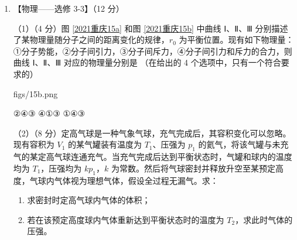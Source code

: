 \documentclass[\gkver]{gaokaozhenti}
\begin{document}
\begin{enumerate}
\item
【物理——选修 3-3】（12 分）

（1）（4 分）图 \ref{2021重庆15a} 和图 \ref{2021重庆15b} 中曲线 Ⅰ、Ⅱ、Ⅲ 分别描述了某物理量随分子之间的距离变化的规律，$r_{0}$ 为平衡位置。现有如下物理量：①分子势能，②分子间引力，③分子间斥力，④分子间引力和斥力的合力，则曲线 Ⅰ、Ⅱ、Ⅲ 对应的物理量分别是 （在给出的 4 个选项中，只有一个符合要求的）

{figs/15b.png}

{②④③}
{④①③}
{①④③}

（2）（8 分）定高气球是一种气象气球，充气完成后，其容积变化可以忽略。现有容积为 $V_{1}$ 的某气罐装有温度为 $T_{1}$、压强为 $p_{1}$ 的氦气，将该气罐与未充气的某定高气球连通充气。当充气完成后达到平衡状态时，气罐和球内的温度均为 $T_{1}$，压强均为 $kp_{1}$，$k$ 为常数。然后将气球密封并释放升空至某预定高度，气球内气体视为理想气体，假设全过程无漏气。求：
\begin{enumerate}
	\item
	求密封时定高气球内气体的体积；
	\item
	若在该预定高度球内气体重新达到平衡状态时的温度为 $T_{2}$，求此时气体的压强。
\end{enumerate}



\end{enumerate}
\end{document}
